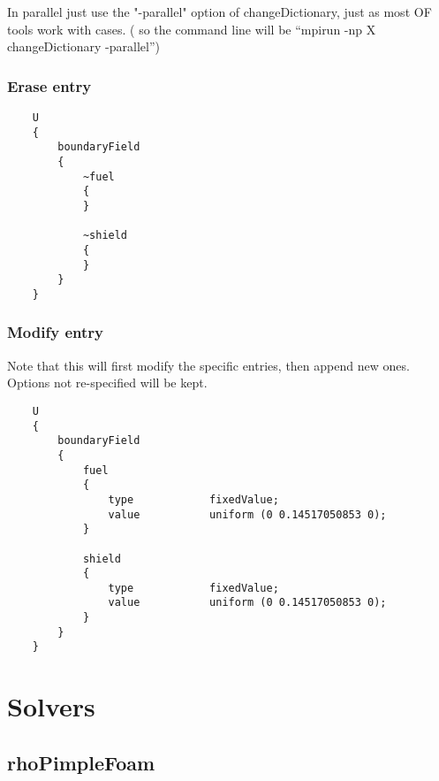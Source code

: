 \documentclass[a4paper, 12pt]{article}
\numberwithin{equation}{section}
\begin{document}
    In parallel just use the "-parallel" option of changeDictionary, just as most OF tools work with cases.
    ( so the command line will be ``mpirun -np X changeDictionary -parallel'')

    \subsubsection{Erase entry}
    \begin{minipage}{\textwidth}
    \vspace{12pt}
    {
    \begin{verbatim}
    U
    {
        boundaryField
        {
            ~fuel
            {
            }

            ~shield
            {
            }
        }
    }
    \end{verbatim}
    }
    \end{minipage}

    \subsubsection{Modify entry}

    Note that this will first modify the specific entries, then append new ones. Options not re-specified will be kept.

    \begin{minipage}{\textwidth}
    \vspace{12pt}
    {
    \begin{verbatim}
    U
    {
        boundaryField
        {
            fuel
            {
                type            fixedValue;
                value           uniform (0 0.14517050853 0);
            }

            shield
            {
                type            fixedValue;
                value           uniform (0 0.14517050853 0);
            }
        }
    }
    \end{verbatim}
    }
    \end{minipage}

\clearpage
\section{Solvers}

    \subsection{rhoPimpleFoam}
\end{document}
